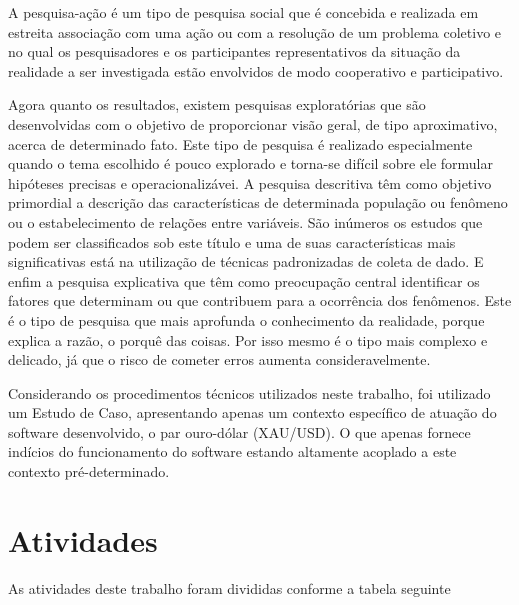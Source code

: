 A pesquisa-ação é um tipo de pesquisa social que é concebida e
realizada em estreita associação com uma ação ou com a resolução
de um problema coletivo e no qual os pesquisadores e os participantes
representativos da situação da realidade a ser investigada estão
envolvidos de modo cooperativo e participativo. \cite{thiollent}

Agora quanto os resultados, existem pesquisas exploratórias que são desenvolvidas com o objetivo de proporcionar visão
geral, de tipo aproximativo, acerca de determinado fato. Este tipo de pesquisa
é realizado especialmente quando o tema escolhido é pouco explorado e torna-se
difícil sobre ele formular hipóteses precisas e operacionalizávei.
A pesquisa descritiva têm como objetivo primordial a descrição das características
de determinada população ou fenômeno ou o estabelecimento de
relações entre variáveis. São inúmeros os estudos que podem ser classificados sob
este título e uma de suas características mais significativas está na utilização de
técnicas padronizadas de coleta de dado. E enfim a pesquisa explicativa que têm como preocupação central identificar os fatores
que determinam ou que contribuem para a ocorrência dos fenômenos. Este
é o tipo de pesquisa que mais aprofunda o conhecimento da realidade, porque explica a razão, o porquê das coisas.
Por isso mesmo é o tipo mais complexo e delicado, já que o risco de cometer erros aumenta consideravelmente.  \cite{gil}

Considerando os procedimentos técnicos utilizados neste trabalho, foi utilizado um Estudo de Caso, apresentando apenas um
contexto específico de atuação do software desenvolvido, o par ouro-dólar (XAU/USD). O que apenas fornece indícios do funcionamento
do software estando altamente acoplado a este contexto pré-determinado.

\section[Atividades]{Atividades}

As atividades deste trabalho foram divididas conforme a tabela seguinte


